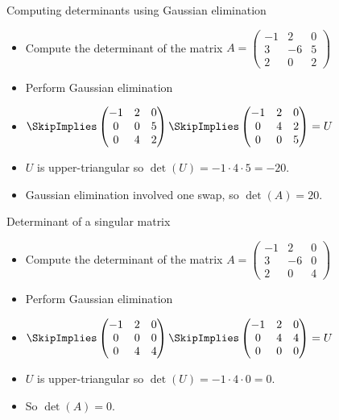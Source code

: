 \documentclass[handout]{beamer}
\begin{document}

\begin{frame}{Computing determinants using Gaussian elimination}
\begin{itemize}
\item Compute the determinant of the matrix
$A=
\begin{pmatrix}
-1 & 2 & 0 \\
3 & -6 & 5 \\
2 & 0 & 2
\end{pmatrix}
$
\item Perform Gaussian elimination
\item
$
\SkipImplies
\begin{pmatrix}
-1 & 2 & 0 \\
0 & 0 & 5 \\
0 & 4 & 2
\end{pmatrix}
\SkipImplies
\begin{pmatrix}
-1 & 2 & 0 \\
0 & 4 & 2 \\
0 & 0 & 5 \\
\end{pmatrix}
= U
$
\item $U$ is upper-triangular so $\det(U) = -1 \cdot 4 \cdot 5 = -20$.
\item Gaussian elimination involved one swap, so $\det(A) = 20$.
\end{itemize}
\end{frame}


\begin{frame}{Determinant of a singular matrix}
\begin{itemize}
\item Compute the determinant of the matrix
$A=
\begin{pmatrix}
-1 & 2 & 0 \\
3 & -6 & 0 \\
2 & 0 & 4
\end{pmatrix}
$
\item Perform Gaussian elimination
\item
$
\SkipImplies
\begin{pmatrix}
-1 & 2 & 0 \\
0 & 0 & 0 \\
0 & 4 & 4
\end{pmatrix}
\SkipImplies
\begin{pmatrix}
-1 & 2 & 0 \\
0 & 4 & 4 \\
0 & 0 & 0 \\
\end{pmatrix}
= U
$
\item $U$ is upper-triangular so $\det(U) = -1 \cdot 4 \cdot 0 = 0$.
\item So $\det(A) = 0$.
\end{itemize}
\end{frame}
\end{document}
